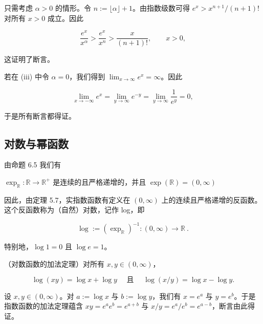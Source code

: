 \begin{proposition}
\begin{subitems}
只需考虑 $ \alpha > 0 $ 的情形。令 $ n := \lfloor \alpha \rfloor + 1 $。由指数级数可得 $ e^x > x^{n+1}/(n+1) $! 对所有 $ x > 0 $ 成立。因此

\[
\frac{e^{x}}{x^{\alpha}}>\frac{e^{x}}{x^{n}}>\frac{x}{(n+1)!},\qquad x>0,
\]

这证明了断言。

\item[（iv）]

若在 (iii) 中令 $ \alpha = 0 $，我们得到 $ \lim_{x \to \infty} e^x = \infty $。因此

\[
\lim_{x\to-\infty}e^{x}=\lim_{y\to\infty}e^{-y}=\lim_{y\to\infty}\frac{1}{e^{y}}=0,
\]

于是所有断言都得证。

\end{subitems}

\end{proposition}

\subsection*{对数与幂函数}

由命题 6.5 我们有

$ \exp_{\mathbb{R}}: \mathbb{R} \to \mathbb{R}^+ \text{ 是连续的且严格递增的，并且 } \exp(\mathbb{R}) = (0, \infty) $

因此，由定理 5.7，实指数函数有定义在 $(0,\infty)$ 上的连续且严格递增的反函数。这个反函数称为（自然）对数，记作 log，即

\[
\operatorname{l o g}:=\left(\operatorname{e x p}_{\mathbb{R}}\right)^{-1}:(0,\infty)\to\mathbb{R}~.
\]

特别地，$ \log 1 = 0 $ 且 $ \log e = 1 $。

\begin{theorem}

（对数函数的加法定理）对所有 $ x, y \in (0, \infty) $，

\[
\log(xy)=\log x+\log y\quad\text{ 且 }\quad\log(x/y)=\log x-\log y.
\]

\proofhead
设 $x, y \in (0, \infty)$。对 $a := \log x$ 与 $b := \log y$，我们有 $x = e^a$ 与 $y = e^b$。于是指数函数的加法定理蕴含 $xy = e^a e^b = e^{a+b}$ 与 $x/y = e^a / e^b = e^{a-b}$，断言由此得证。
\end{theorem}

